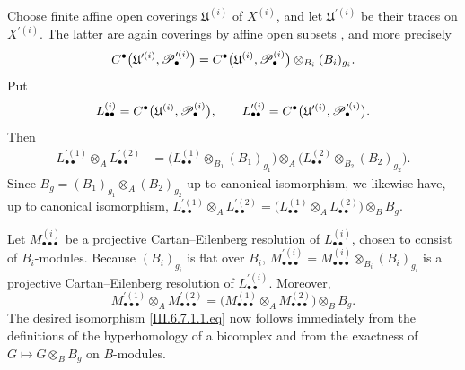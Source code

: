 \begin{env}[6.7.1]

Choose finite affine open coverings $\mathfrak U^{(i)}$ of
$X^{(i)}$, and let $\mathfrak U^{\prime(i)}$ be their traces on
$X^{\prime(i)}$.  The latter are again coverings by affine open
subsets , and more precisely
\[
  C^\bullet
  \bigl(
    \mathfrak U^{\prime(i)},\mathscr{P}_\bullet^{\prime(i)}
  \bigr)
  =
  C^\bullet
  \bigl(
    \mathfrak U^{(i)},\mathscr{P}_\bullet^{(i)}
  \bigr)
  \otimes_{B_i}(B_i)_{g_i}.
\]
Put
\[
  L_{\bullet\bullet}^{(i)}
  =
  C^\bullet
  \bigl(
    \mathfrak U^{(i)},\mathscr{P}_\bullet^{(i)}
  \bigr),
  \qquad
  L_{\bullet\bullet}^{\prime(i)}
  =
  C^\bullet
  \bigl(
    \mathfrak U^{\prime(i)},\mathscr{P}_\bullet^{\prime(i)}
  \bigr).
\]
Then
\[
\begin{split}
  L_{\bullet\bullet}^{\prime(1)}
  \otimes_A L_{\bullet\bullet}^{\prime(2)}
  &=
  \bigl(
    L_{\bullet\bullet}^{(1)}
    \otimes_{B_1}(B_1)_{g_1}
  \bigr)
  \otimes_A
  \bigl(
    L_{\bullet\bullet}^{(2)}
    \otimes_{B_2}(B_2)_{g_2}
  \bigr).
\end{split}
\]
Since $B_g=(B_1)_{g_1}\otimes_A(B_2)_{g_2}$
up to canonical isomorphism, we likewise have, up to canonical
isomorphism, $L_{\bullet\bullet}^{\prime(1)}
\otimes_A L_{\bullet\bullet}^{\prime(2)}
=
\bigl(
L_{\bullet\bullet}^{(1)}
\otimes_A L_{\bullet\bullet}^{(2)}
\bigr)
\otimes_BB_g$.

Let $M_{\bullet\bullet\bullet}^{(i)}$ be a projective
Cartan--Eilenberg resolution of $L_{\bullet\bullet}^{(i)}$,
chosen to consist of $B_i$-modules.  Because $(B_i)_{g_i}$ is
flat over $B_i$, $M_{\bullet\bullet\bullet}^{\prime(i)}
=
M_{\bullet\bullet\bullet}^{(i)}
\otimes_{B_i}(B_i)_{g_i}$
is a projective Cartan--Eilenberg resolution of
$L_{\bullet\bullet}^{\prime(i)}$.  Moreover,
\[
  M_{\bullet\bullet\bullet}^{\prime(1)}
  \otimes_A M_{\bullet\bullet\bullet}^{\prime(2)}
  =
  \bigl(
    M_{\bullet\bullet\bullet}^{(1)}
    \otimes_A M_{\bullet\bullet\bullet}^{(2)}
  \bigr)
  \otimes_BB_g.
\]
The desired isomorphism \eqref{III.6.7.1.1.eq} now follows
immediately from the definitions of the hyperhomology of a
bicomplex and from the exactness of
$G\longmapsto G\otimes_BB_g$ on $B$-modules.
\end{env}


